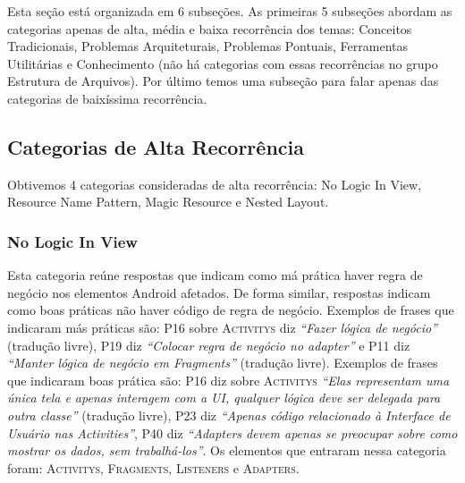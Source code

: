 Esta se\c{c}\~ao est\'a organizada em 6 subse\c{c}\~oes. As primeiras 5 subse\c{c}\~oes abordam as categorias apenas de alta, m\'edia e baixa recorr\^encia dos temas: Conceitos Tradicionais, Problemas Arquiteturais, Problemas Pontuais, Ferramentas Utilit\'arias e Conhecimento (n\~ao h\'a categorias com essas recorr\^encias no grupo Estrutura de Arquivos). Por \'ultimo temos uma subse\c{c}\~ao para falar apenas das categorias de baix\'issima recorr\^encia.

\subsection{Categorias de Alta Recorr\^encia}
Obtivemos 4 categorias consideradas de alta recorr\^encia: No Logic In View, Resource Name Pattern, Magic Resource e Nested Layout.

\subsubsection{No Logic In View}
Esta categoria re\'une respostas que indicam como m\'a pr\'atica haver regra de neg\'ocio nos elementos Android afetados. De forma similar, respostas indicam como boas pr\'aticas n\~ao haver c\'odigo de regra de neg\'ocio. Exemplos de frases que indicaram m\'as pr\'aticas s\~ao: P16 sobre \textsc{Activitys} diz \textit{``Fazer l\'ogica de neg\'ocio''} (tradu\c{c}\~ao livre), P19 diz \textit{``Colocar regra de neg\'ocio no adapter''} e P11 diz \textit{``Manter l\'ogica de neg\'ocio em Fragments''} (tradu\c{c}\~ao livre). Exemplos de frases que indicaram boas pr\'atica s\~ao: P16 diz sobre \textsc{Activitys} \textit{``Elas representam uma \'unica tela e apenas interagem com a UI, qualquer l\'ogica deve ser delegada para outra classe''} (tradu\c{c}\~ao livre), P23 diz \textit{``Apenas c\'odigo relacionado \`a Interface de Usu\'ario nas Activities''}, P40 diz \textit{``Adapters devem apenas se preocupar sobre como mostrar os dados, sem trabalh\'a-los''}. Os elementos que entraram nessa categoria foram: \textsc{Activitys}, \textsc{Fragments}, \textsc{Listeners} e \textsc{Adapters}. 



